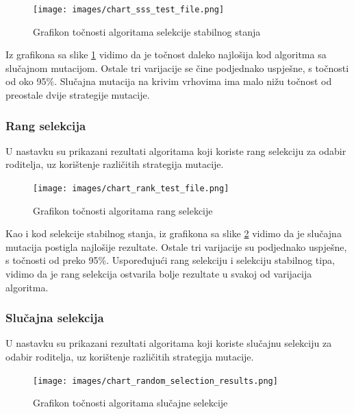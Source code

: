 \documentclass[times, utf8, zavrsni, numeric]{fer}
\begin{document}
\begin{figure}[h]
\centering
\texttt{[image: images/chart\_sss\_test\_file.png]}
\caption{Grafikon točnosti algoritama selekcije stabilnog stanja}
\label{fig:grafikon tocnosti algoritama selekcije stabilnog stanja}
\end{figure}

Iz grafikona sa slike \ref{fig:grafikon tocnosti algoritama selekcije stabilnog stanja} vidimo da je točnost daleko najlošija kod algoritma sa slučajnom mutacijom. Ostale tri varijacije se čine podjednako uspješne, s točnosti od oko 95\%. Slučajna mutacija na krivim vrhovima ima malo nižu točnost od preostale dvije strategije mutacije.

\newpage
\subsubsection{Rang selekcija}
U nastavku su prikazani rezultati algoritama koji koriste rang selekciju za odabir roditelja, uz korištenje različitih strategija mutacije.

\begin{figure}[h]
\centering
\texttt{[image: images/chart\_rank\_test\_file.png]}
\caption{Grafikon točnosti algoritama rang selekcije}
\label{fig:grafikon tocnosti algoritama rank selekcije}
\end{figure}

Kao i kod selekcije stabilnog stanja, iz  grafikona sa slike \ref{fig:grafikon tocnosti algoritama rank selekcije} vidimo da je slučajna mutacija postigla najlošije rezultate. Ostale tri varijacije su podjednako uspješne, s točnosti od preko 95\%. Uspoređujući rang selekciju i selekciju stabilnog tipa, vidimo da je rang selekcija ostvarila bolje rezultate u svakoj od varijacija algoritma.

\newpage
\subsubsection{Slučajna selekcija}
U nastavku su prikazani rezultati algoritama koji koriste slučajnu selekciju za odabir roditelja, uz korištenje različitih strategija mutacije.

\begin{figure}[h]
\centering
\texttt{[image: images/chart\_random\_selection\_results.png]}
\caption{Grafikon točnosti algoritama slučajne selekcije}
\label{fig:grafikon tocnosti algoritama slucajne selekcije}
\end{figure}
\end{document}
